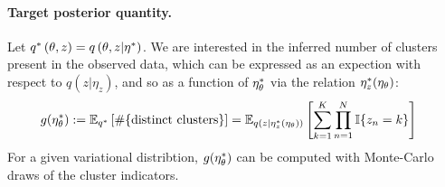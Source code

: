 

\paragraph{Target posterior quantity.}

Let $q^{*}\left(\theta, z\right) = q\left(\theta, z \vert \eta^{*}\right)$.
We are interested in the inferred number of clusters present in the observed
data, which can be expressed as an expection with respect to
$q\left(z \vert \eta_z \right)$, and so as a function of
$\eta_\theta^{*}$ via the relation $\eta_z^{*}(\eta_\theta)$:
%
\begin{align}
g(\eta_\theta^{*}) &:=
\mathbb{E}_{q^{*}} \left[ \#\{\text{distinct clusters}\} \right]  =
\mathbb{E}_{q(z \vert \eta_z^{*}(\eta_\theta))} \left[
    \sum_{k=1}^K \prod_{n=1}^N \mathbb{I}\{z_n = k\} \right]
    \label{eq:expected_num_clusters}
\end{align}
%
For a given variational distribtion, $g(\eta_\theta^{*})$ can be computed with
Monte-Carlo draws of the cluster indicators.

%
%
